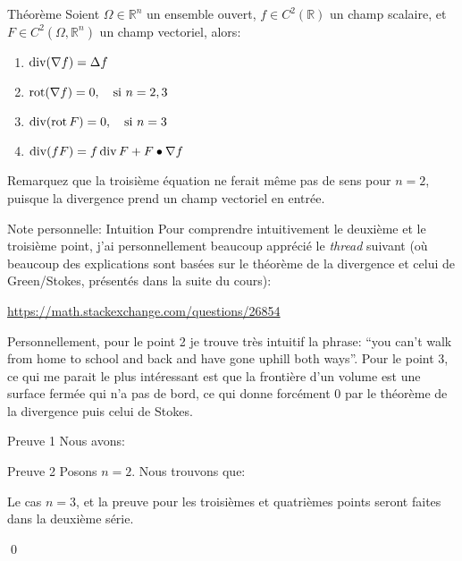 \documentclass[a4paper]{article}
\begin{document}
\begin{parag}{Théorème}
    Soient $\Omega \in \mathbb{R}^n$ un ensemble ouvert, $f \in C^2\left(\mathbb{R}\right)$ un champ scalaire, et $F \in C^2\left(\Omega, \mathbb{R}^n\right)$ un champ vectoriel, alors: 
    \begin{enumerate}
        \item $\displaystyle \Div\left(\nabla f\right) = \Delta f$
        \item $\displaystyle \rot\left(\nabla f\right) = 0, \mathspace \text{si } n = 2, 3$
        \item $\displaystyle \Div\left(\rot F\right) = 0, \mathspace \text{si } n = 3$
        \item $\displaystyle \Div\left(f F\right) = f \Div F + F \dotprod \nabla f$
    \end{enumerate}

    Remarquez que la troisième équation ne ferait même pas de sens pour $n= 2$, puisque la divergence prend un champ vectoriel en entrée.

    \begin{subparag}{Note personnelle: Intuition}
        Pour comprendre intuitivement le deuxième et le troisième point, j'ai personnellement beaucoup apprécié le \textit{thread} suivant (où beaucoup des explications sont basées sur le théorème de la divergence et celui de Green/Stokes, présentés dans la suite du cours):
        \begin{center}
            \url{https://math.stackexchange.com/questions/26854}
        \end{center}
        
        Personnellement, pour le point 2 je trouve très intuitif la phrase: ``you can't walk from home to school and back and have gone uphill both ways''. Pour le point 3, ce qui me parait le plus intéressant est que la frontière d'un volume est une surface fermée qui n'a pas de bord, ce qui donne forcément 0 par le théorème de la divergence puis celui de Stokes.
    \end{subparag}

    \begin{subparag}{Preuve 1}
        Nous avons:
    \end{subparag}

    \begin{subparag}{Preuve 2}
        Posons $n = 2$. Nous trouvons que:
        
        Le cas $n = 3$, et la preuve pour les troisièmes et quatrièmes points seront faites dans la deuxième série.

        \qed
    \end{subparag}
\end{parag}
\end{document}
